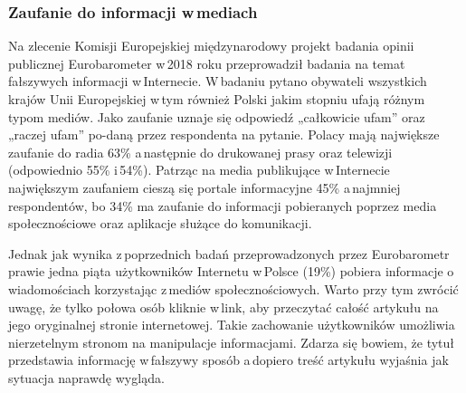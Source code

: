 
\subsubsection{Zaufanie do informacji w\,mediach}
Na zlecenie Komisji Europejskiej międzynarodowy projekt badania opinii publicznej Eurobarometer w\,2018 roku przeprowadził badania na temat fałszywych informacji w\,Internecie\cite{Eurobarometer4642018}. W\,badaniu pytano obywateli wszystkich krajów Unii Europejskiej w\,tym również Polski jakim stopniu ufają różnym typom mediów. Jako zaufanie uznaje się odpowiedź „całkowicie ufam” oraz „raczej ufam” po-daną przez respondenta na pytanie. Polacy mają największe zaufanie do radia 63\% a\,następnie do drukowanej prasy oraz telewizji (odpowiednio 55\% i\,54\%). Patrząc na media publikujące w\,Internecie największym zaufaniem cieszą się portale informacyjne 45\% a\,najmniej respondentów, bo 34\% ma zaufanie do informacji pobieranych poprzez media społecznościowe oraz aplikacje służące do komunikacji. 
\par
Jednak jak wynika z\,poprzednich badań przeprowadzonych przez Eurobarometr prawie jedna piąta użytkowników Internetu w\,Polsce (19\%) pobiera informacje o wiadomościach korzystając z\,mediów społecznościowych. Warto przy tym zwrócić uwagę, że tylko połowa osób kliknie w\,link, aby przeczytać całość artykułu na jego oryginalnej stronie internetowej\cite{Eurobarometer2016}. Takie zachowanie użytkowników umożliwia nierzetelnym stronom na manipulacje informacjami. Zdarza się bowiem, że tytuł przedstawia informację w\,fałszywy sposób a\,dopiero treść artykułu wyjaśnia jak sytuacja naprawdę wygląda. 
